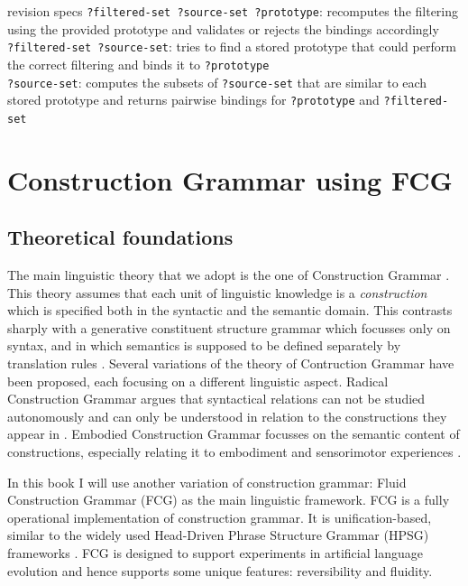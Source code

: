 \begin{explanation}{revision specs}
  \verb+?filtered-set ?source-set ?prototype+: recomputes the filtering using the provided prototype and validates or rejects the bindings accordingly \\
  \verb+?filtered-set ?source-set+: tries to find a stored prototype that could perform the correct filtering and binds it to \verb+?prototype+ \\
  \verb+?source-set+: computes the subsets of \verb+?source-set+ that
  are similar to each stored prototype and returns pairwise bindings
  for \verb+?prototype+ and \verb+?filtered-set+
\end{explanation}

\section{Construction Grammar using FCG}
\label{s:fcg}

\subsection{Theoretical foundations}

The main linguistic theory that we adopt is the one of Construction
Grammar \citep{goldberg95constructions, goldberg03constructions}. This
theory assumes that each unit of linguistic knowledge is a
\emph{construction} which is specified both in the syntactic and the
semantic domain. This contrasts sharply with a generative constituent
structure grammar which focusses only on syntax, and in which
semantics is supposed to be defined separately by translation rules
\citep{chomsky57syntactic}. Several variations of the theory
of Contruction Grammar have been proposed, each focusing on a different
linguistic aspect. Radical Construction Grammar argues that
syntactical relations can not be studied autonomously and can only be
understood in relation to the constructions they appear in
\citep{croft01radical}. Embodied Construction Grammar focusses on the
semantic content of constructions, especially relating it to
embodiment and sensorimotor experiences \citep{bergen03embodied}.

In this book I will use another variation of construction grammar:
Fluid Construction Grammar (FCG) as the main linguistic framework. FCG
is a fully operational implementation of construction grammar. It is
unification-based, similar to the widely used Head-Driven Phrase
Structure Grammar (HPSG) frameworks \citep{pollard94hpsg}. FCG is
designed to support experiments in artificial language evolution and
hence supports some unique features: reversibility and fluidity.

